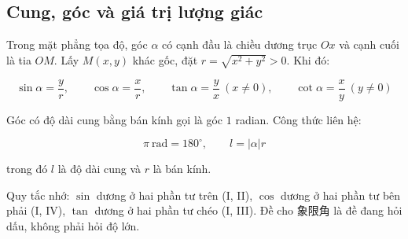 \documentclass[11pt, a4paper]{article}
\begin{document}
\subsection{Cung, góc và giá trị lượng giác}

\begin{dinhnghia}
Trong mặt phẳng tọa độ, góc $\alpha$ có cạnh đầu là chiều dương trục $Ox$ và cạnh cuối là tia $OM$. Lấy $M(x, y)$ khác gốc, đặt $r = \sqrt{x^2 + y^2} > 0$. Khi đó:

$$\sin\alpha = \frac{y}{r}, \qquad \cos\alpha = \frac{x}{r}, \qquad \tan\alpha = \frac{y}{x}\ (x \neq 0), \qquad \cot\alpha = \frac{x}{y}\ (y \neq 0)$$
\end{dinhnghia}
\begin{dinhnghia}[{2 — Radian}]
Góc có độ dài cung bằng bán kính gọi là góc $1$ radian. Công thức liên hệ:

$$\pi \ \text{rad} = 180^\circ, \qquad l = |\alpha| r$$

trong đó $l$ là độ dài cung và $r$ là bán kính.
\end{dinhnghia}
\begin{dinhly}

 Quy tắc nhớ: $\sin$ dương ở hai phần tư trên (I, II), $\cos$ dương ở hai phần tư bên phải (I, IV), $\tan$ dương ở hai phần tư chéo (I, III). Đề cho 象限角 là đề đang hỏi dấu, không phải hỏi độ lớn.
\end{dinhly}
\begin{dinhly}
\end{dinhly}
\end{document}
